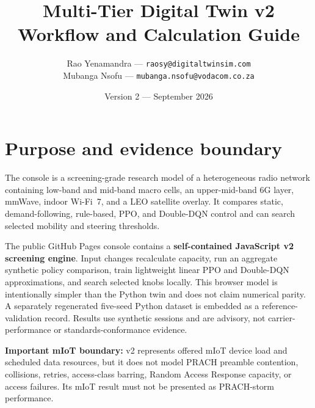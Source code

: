 \documentclass[10pt]{article}
\title{Multi-Tier Digital Twin v2\\Workflow and Calculation Guide}
\author{Rao Yenamandra --- \texttt{raosy@digitaltwinsim.com}\\
Mubanga Nsofu --- \texttt{mubanga.nsofu@vodacom.co.za}}
\date{Version 2 --- September 2026}
\begin{document}
\maketitle

\section{Purpose and evidence boundary}
The console is a screening-grade research model of a heterogeneous radio network containing low-band and mid-band macro cells, an upper-mid-band 6G layer, mmWave, indoor Wi-Fi~7, and a LEO satellite overlay. It compares static, demand-following, rule-based, PPO, and Double-DQN control and can search selected mobility and steering thresholds.

The public GitHub Pages console contains a \textbf{self-contained JavaScript v2 screening engine}. Input changes recalculate capacity, run an aggregate synthetic policy comparison, train lightweight linear PPO and Double-DQN approximations, and search selected knobs locally. This browser model is intentionally simpler than the Python twin and does not claim numerical parity. A separately regenerated five-seed Python dataset is embedded as a reference-validation record. Results use synthetic sessions and are advisory, not carrier-performance or standards-conformance evidence.

\textbf{Important mIoT boundary:} v2 represents offered mIoT device load and scheduled data resources, but it does not model PRACH preamble contention, collisions, retries, access-class barring, Random Access Response capacity, or access failures. Its mIoT result must not be presented as PRACH-storm performance.
\end{document}

